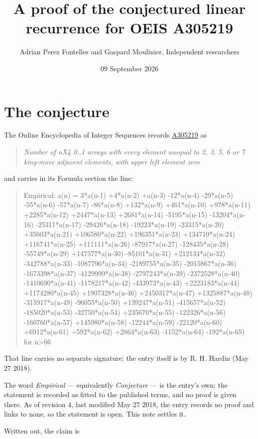 \documentclass[11pt]{article}
\title{A proof of the conjectured linear recurrence for OEIS A305219}
\author{Adrian Perez Fontelles and Gaspard Moulinier, Independent researchers}
\date{09 September 2026}
\theoremstyle{definition}
\begin{document}
\maketitle
\section{The conjecture}

The Online Encyclopedia of Integer Sequences records \href{https://oeis.org/A305219}{A305219} as

\begin{quote}\itshape Number of nX4 0..1 arrays with every element unequal to 2, 3, 5, 6 or 7 king-move adjacent elements, with upper left element zero\end{quote}

and carries in its Formula section the line:

\begin{quote}\ttfamily Empirical: a(n) = 3*a(n-1) +4*a(n-2) +a(n-3) -12*a(n-4) -29*a(n-5) -55*a(n-6) -57*a(n-7) -86*a(n-8) +132*a(n-9) +461*a(n-10) +978*a(n-11) +2285*a(n-12) +2447*a(n-13) +2681*a(n-14) -5195*a(n-15) -13204*a(n-16) -25311*a(n-17) -29426*a(n-18) -19223*a(n-19) -23315*a(n-20) +35603*a(n-21) +106580*a(n-22) +196351*a(n-23) +134710*a(n-24) +116741*a(n-25) +111111*a(n-26) -87917*a(n-27) -128435*a(n-28) -55749*a(n-29) +147577*a(n-30) -85101*a(n-31) +212134*a(n-32) -342788*a(n-33) -1087796*a(n-34) -2189755*a(n-35) -2015867*a(n-36) -1673398*a(n-37) -4129999*a(n-38) -2797243*a(n-39) -2372528*a(n-40) -1410690*a(n-41) -1178217*a(n-42) -433973*a(n-43) +2223183*a(n-44) +1174280*a(n-45) +1907328*a(n-46) +2450317*a(n-47) +1325887*a(n-48) -315917*a(n-49) -96055*a(n-50) +139247*a(n-51) -415657*a(n-52) -185020*a(n-53) -32750*a(n-54) +235670*a(n-55) -122326*a(n-56) -160760*a(n-57) +145980*a(n-58) -12244*a(n-59) -22120*a(n-60) +6912*a(n-61) +592*a(n-62) +2864*a(n-63) -1152*a(n-64) -192*a(n-65) for n>66\end{quote}

That line carries no separate signature; the entry itself is by R. H. Hardin (May 27 2018).

The word {\itshape Empirical} --- equivalently {\itshape Conjecture} --- is the entry's own: the statement is recorded as fitted to the published terms, and no proof is given there. As of revision 4, last modified May 27 2018, the entry records no proof and links to none, so the statement is open. This note settles it.

Written out, the claim is
\end{document}
